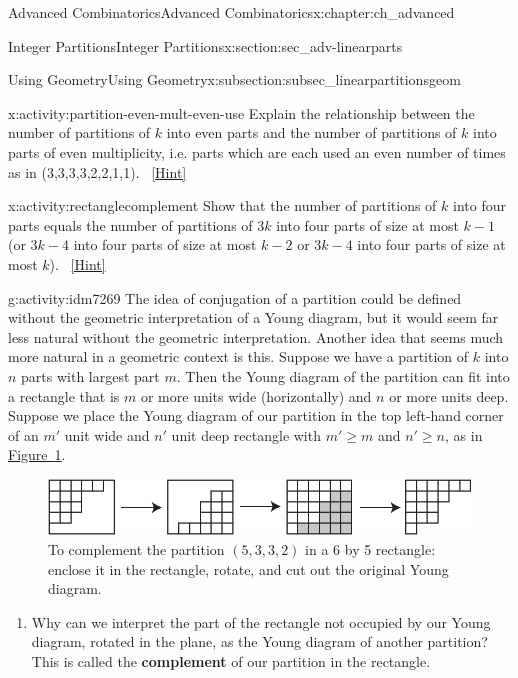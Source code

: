 \documentclass[oneside,10pt,]{book}
\newcommand{\terminology}[1]{\textbf{#1}}
\numberwithin{equation}{chapter}
\begin{document}
\begin{chapterptx}{Advanced Combinatorics}{}{Advanced Combinatorics}{}{}{x:chapter:ch_advanced}
\begin{sectionptx}{Integer Partitions}{}{Integer Partitions}{}{}{x:section:sec_adv-linearparts}
\begin{subsectionptx}{Using Geometry}{}{Using Geometry}{}{}{x:subsection:subsec_linearpartitionsgeom}
\begin{introduction}{}
\begin{activity}{}{x:activity:partition-even-mult-even-use}%
Explain the relationship between the number of partitions of \(k\) into even parts and the number of partitions of \(k\) into parts of even multiplicity, i.e. parts which are each used an even number of times as in (3,3,3,3,2,2,1,1).%
\qquad~\hfill{\tiny\hyperlink{g:hint:idm7237-back}{[Hint]}}\end{activity}
\begin{activity}{}{x:activity:rectanglecomplement}%
Show that the number of partitions of \(k\) into four parts equals the number of partitions of \(3k\) into four parts of size at most \(k-1\) (or \(3k-4\) into four parts of size at most \(k-2\) or \(3k-4\) into four parts of size at most \(k\)).%
\qquad~\hfill{\tiny\hyperlink{g:hint:idm7253-back}{[Hint]}}\end{activity}
\begin{activity}{}{g:activity:idm7269}%
The idea of conjugation of a partition could be defined without the geometric interpretation of a Young diagram, but it would seem far less natural without the geometric interpretation. Another idea that seems much more natural in a geometric context is this. Suppose we have a partition of \(k\) into \(n\) parts with largest part \(m\). Then the Young diagram of the partition can fit into a rectangle that is \(m\) or more units wide (horizontally) and \(n\) or more units deep. Suppose we place the Young diagram of our partition in the top left-hand corner of an \(m'\) unit wide and \(n'\) unit deep rectangle with \(m'\ge m\) and \(n' \ge n\), as in \hyperref[x:figure:complementpartition]{Figure~\ref{x:figure:complementpartition}}.%
\begin{figure}
\centering
\includegraphics[width=0.7\linewidth]{images/complementpartition}
\caption{To complement the partition \((5,3,3,2)\) in a 6 by 5 rectangle: enclose it in the rectangle, rotate, and cut out the original Young diagram.\label{x:figure:complementpartition}}
\end{figure}
\begin{enumerate}[font=\bfseries,label=(\alph*),ref=\alph*]
\item{}Why can we interpret the part of the rectangle not occupied by our Young diagram, rotated in the plane, as the Young diagram of another partition? This is called the \terminology{complement} of our partition in the rectangle.%

\end{enumerate}
\end{activity}
\end{introduction}
\end{subsectionptx}
\end{sectionptx}
\end{chapterptx}
\end{document}
